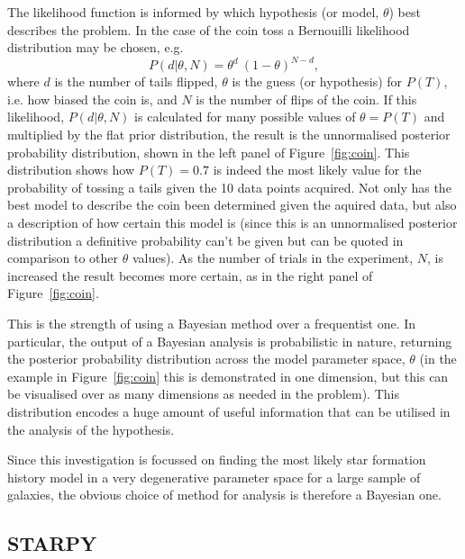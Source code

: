 The likelihood function {\minor is informed by} which hypothesis (or model, $\theta$) best describes the problem. In the {\minor case of the coin toss} a Bernouilli likelihood distribution may be chosen, e.g. 
\begin{equation}\label{bernouilli}
P(d  | \theta, N) = \theta^d~ (1-\theta)^{N-d}, 
\end{equation}
where $d$ is the number of tails flipped, $\theta$ is {\minor the} guess (or hypothesis) for $P(T)$, i.e. how biased the coin is, and $N$ is the number of flips of the coin. If this likelihood, $P(d | \theta, N)$ {\minor is calculated} for many possible values of $\theta = P(T)$ and multiplied {\minor by the} flat prior distribution, the {\minor result is the} unnormalised posterior probability distribution, shown in the left panel of Figure~\ref{fig:coin}. {\minor This distribution shows how} $P(T) = 0.7$ is indeed the most likely value for the probability of tossing a tails given the 10 data points {\minor acquired}. Not only has the best model to describe the coin {\minor been determined} given the {\minor aquired} data, but also {\minor a description of} how certain this model is (since this is an unnormalised posterior distribution a definitive probability {\minor can't be given but can be quoted} in comparison to other $\theta$ values). As the number of trials in the experiment, $N$, {\minor is increased the result becomes more certain}, as in the right panel of Figure~\ref{fig:coin}. 

This is the strength of using a Bayesian method over a frequentist one. In particular, the output of a Bayesian analysis is probabilistic in nature, returning the posterior probability distribution across the model parameter space, $\theta$ (in the example in Figure~\ref{fig:coin} this is demonstrated in one dimension, but this can be visualised over as many dimensions as needed in the problem). This distribution encodes a huge amount of useful information that can be utilised in the analysis of the hypothesis. 

Since this investigation is focussed on finding the most likely star formation history model in a very degenerative parameter space for a large sample of galaxies, the obvious choice of method for analysis is therefore a Bayesian one.  


\subsection{STARPY}

